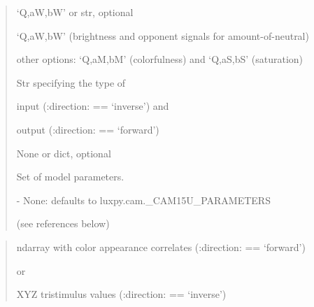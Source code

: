 \documentclass[letterpaper,10pt,english]{sphinxmanual}
\begin{document}
\begin{fulllineitems}
\begin{description}
\begin{quote}
\begin{description}
\item[{outin}] \leavevmode
\begin{DUlineblock}{0em}
\item[] ‘Q,aW,bW’ or str, optional
\item[] ‘Q,aW,bW’ (brightness and opponent signals for amount-of-neutral)
\item[]
\begin{DUlineblock}{\DUlineblockindent}
\item[] other options: ‘Q,aM,bM’ (colorfulness) and ‘Q,aS,bS’ (saturation)
\end{DUlineblock}
\item[] Str specifying the type of 
\item[]
\begin{DUlineblock}{\DUlineblockindent}
\item[] input (:direction: == ‘inverse’) and 
\item[] output (:direction: == ‘forward’)
\end{DUlineblock}
\end{DUlineblock}

\item[{parameters}] \leavevmode
\begin{DUlineblock}{0em}
\item[] None or dict, optional
\item[] Set of model parameters.
\item[]
\begin{DUlineblock}{\DUlineblockindent}
\item[] - None: defaults to luxpy.cam.\_CAM15U\_PARAMETERS 
\item[]
\begin{DUlineblock}{\DUlineblockindent}
\item[] (see references below)
\end{DUlineblock}
\end{DUlineblock}
\end{DUlineblock}

\end{description}\end{quote}

\item[{Returns:}] \leavevmode\begin{quote}\begin{description}
\item[{returns}] \leavevmode
\begin{DUlineblock}{0em}
\item[] ndarray with color appearance correlates (:direction: == ‘forward’)
\item[]
\begin{DUlineblock}{\DUlineblockindent}
\item[] or 
\end{DUlineblock}
\item[] XYZ tristimulus values (:direction: == ‘inverse’)
\end{DUlineblock}


\end{description}
\end{quote}
\end{description}
\end{fulllineitems}
\end{document}
